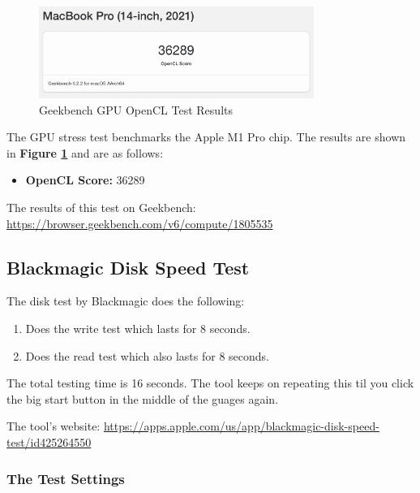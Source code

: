 \documentclass[a4paper]{article}
\begin{document}
\begin{figure}[h!]
    \centering
    \includegraphics[width=0.8\textwidth]{images/geekbench-gpu-opencl.png}
    \caption{Geekbench GPU OpenCL Test Results}
    \label{fig:geekbench-gpu-opencl}
\end{figure}

The GPU stress test benchmarks the Apple M1 Pro chip. The results are shown in \textbf{Figure \ref{fig:geekbench-gpu-opencl}} and are as follows:

\begin{itemize}
    \item \textbf{OpenCL Score:} 36289
\end{itemize}

The results of this test on Geekbench: \url{https://browser.geekbench.com/v6/compute/1805535}

\subsection{Blackmagic Disk Speed Test}

The disk test by Blackmagic does the following:

\begin{enumerate}
    \item Does the write test which lasts for 8 seconds.
    \item Does the read test which also lasts for 8 seconds.
\end{enumerate}

The total testing time is 16 seconds. The tool keeps on repeating this til you click the big start button in the middle of the guages again.

The tool's website: \url{https://apps.apple.com/us/app/blackmagic-disk-speed-test/id425264550}

\subsubsection{The Test Settings}
\end{document}
